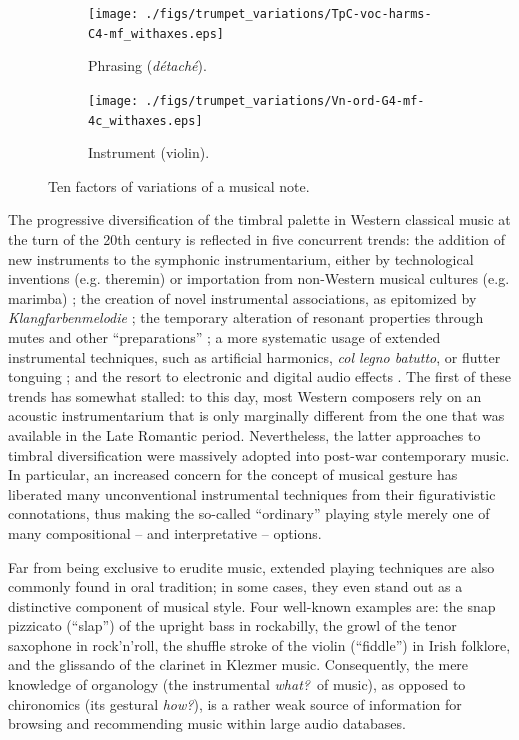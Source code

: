 \documentclass{article}
\makeatletter
\newcommand*{\eg}{e.g.\@\xspace}
\makeatother
\begin{document}
\begin{figure}
        \begin{subfigure}[b]{0.25\textwidth}
                \centering
                \texttt{[image: ./figs/trumpet\_variations/TpC-voc-harms-C4-mf\_withaxes.eps]}
                \caption{Phrasing (\emph{d\'{e}tach\'{e}}).}
                \label{fig:TpC+voc-harms-G4-mf_withaxes}
        \end{subfigure}%
        \begin{subfigure}[b]{0.25\textwidth}
                \centering
                \texttt{[image: ./figs/trumpet\_variations/Vn-ord-G4-mf-4c\_withaxes.eps]}
                \caption{Instrument (violin).}
                \label{fig:Vn-ord-G4-mf-4c}
        \end{subfigure}
        \caption{Ten factors of variations of a musical note.}\label{fig:trumpet-variations}
\end{figure}

The progressive diversification of the timbral palette in Western classical music at the turn of the 20th century is reflected in five concurrent trends:
the addition of new instruments to the symphonic instrumentarium, either by technological inventions (\eg theremin) or importation from non-Western musical cultures (\eg marimba) \cite{sachs2012book};
the creation of novel instrumental associations, as epitomized by \emph{Klangfarbenmelodie} \cite{schoenberg2010book};
the temporary alteration of resonant properties through mutes and other ``preparations'' \cite{dianova2007phd};
a more systematic usage of extended instrumental techniques, such as artificial harmonics, \emph{col legno batutto}, or flutter tonguing \cite{kostka2016book};
and the resort to electronic and digital audio effects \cite{zolzer2011dafx}.
The first of these trends has somewhat stalled: to this day, most Western composers rely on an acoustic instrumentarium that is only marginally different from the one that was available in the Late Romantic period.
Nevertheless, the latter approaches to timbral diversification were massively adopted into post-war contemporary music.
In particular, an increased concern for the concept of musical gesture \cite{godoy2009book} has liberated many unconventional instrumental techniques from their figurativistic connotations, thus making the so-called ``ordinary'' playing style merely one of many compositional -- and interpretative -- options.

Far from being exclusive to erudite music, extended playing techniques are also commonly found in oral tradition; in some cases, they even stand out as a distinctive component of musical style.
Four well-known examples are:
the snap pizzicato (``slap'') of the upright bass in rockabilly,
the growl of the tenor saxophone in rock'n'roll,
the shuffle stroke of the violin (``fiddle'') in Irish folklore,
and the glissando of the clarinet in Klezmer music.
Consequently, the mere knowledge of organology (the instrumental \emph{what?}~of music), as opposed to chironomics (its gestural \emph{how?}), is a rather weak source of information for browsing and recommending music within large audio databases.
\end{document}
